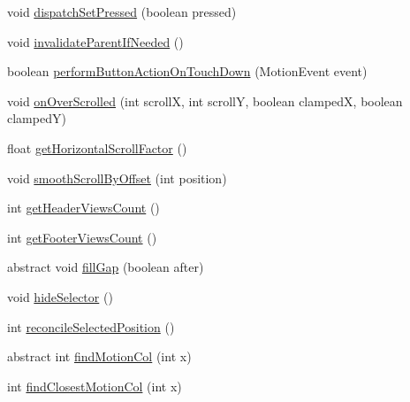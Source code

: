 \begin{DoxyCompactItemize}
\item 
void \hyperlink{classit_1_1sephiroth_1_1android_1_1library_1_1widget_1_1_abs_h_list_view_a27bead41c72751763d0b5b462dccd5b0}{dispatch\+Set\+Pressed} (boolean pressed)
\item 
void \hyperlink{classit_1_1sephiroth_1_1android_1_1library_1_1widget_1_1_abs_h_list_view_a7f7bfc82c9497595062fd5a491c78eee}{invalidate\+Parent\+If\+Needed} ()
\item 
boolean \hyperlink{classit_1_1sephiroth_1_1android_1_1library_1_1widget_1_1_abs_h_list_view_a4a61c4b5cf90d89d64231007e40b9409}{perform\+Button\+Action\+On\+Touch\+Down} (Motion\+Event event)
\item 
void \hyperlink{classit_1_1sephiroth_1_1android_1_1library_1_1widget_1_1_abs_h_list_view_a5f61094fb02c6a855df6d46fcc4ba232}{on\+Over\+Scrolled} (int scrollX, int scrollY, boolean clampedX, boolean clampedY)
\item 
float \hyperlink{classit_1_1sephiroth_1_1android_1_1library_1_1widget_1_1_abs_h_list_view_acebf227bdc3b112774d9e4d4e0226a29}{get\+Horizontal\+Scroll\+Factor} ()
\item 
void \hyperlink{classit_1_1sephiroth_1_1android_1_1library_1_1widget_1_1_abs_h_list_view_a804b81e4836ae4b0f80df135c7263566}{smooth\+Scroll\+By\+Offset} (int position)
\item 
int \hyperlink{classit_1_1sephiroth_1_1android_1_1library_1_1widget_1_1_abs_h_list_view_ac59ad76e2a6aa0a6f3c328576667b30b}{get\+Header\+Views\+Count} ()
\item 
int \hyperlink{classit_1_1sephiroth_1_1android_1_1library_1_1widget_1_1_abs_h_list_view_ae2976774c948184ebd0894bbf8faf9fe}{get\+Footer\+Views\+Count} ()
\item 
abstract void \hyperlink{classit_1_1sephiroth_1_1android_1_1library_1_1widget_1_1_abs_h_list_view_a507937de34782e1b385215fc9c85a558}{fill\+Gap} (boolean after)
\item 
void \hyperlink{classit_1_1sephiroth_1_1android_1_1library_1_1widget_1_1_abs_h_list_view_a30da781342b096fc355ad674d6fd64f6}{hide\+Selector} ()
\item 
int \hyperlink{classit_1_1sephiroth_1_1android_1_1library_1_1widget_1_1_abs_h_list_view_ae85c1fa753583741abee13542743cef7}{reconcile\+Selected\+Position} ()
\item 
abstract int \hyperlink{classit_1_1sephiroth_1_1android_1_1library_1_1widget_1_1_abs_h_list_view_a71c1ed69a6ae3797122ef6270da8c8e5}{find\+Motion\+Col} (int x)
\item 
int \hyperlink{classit_1_1sephiroth_1_1android_1_1library_1_1widget_1_1_abs_h_list_view_ac75be4f1686aaac4a34ee0bee6893728}{find\+Closest\+Motion\+Col} (int x)

\end{DoxyCompactItemize}

